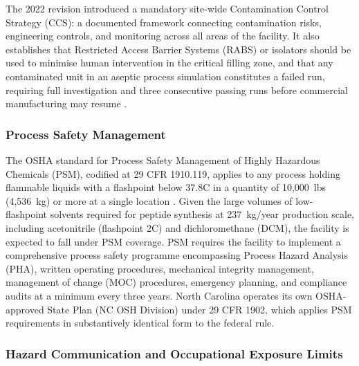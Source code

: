 The 2022 revision introduced a mandatory site-wide Contamination Control Strategy (CCS): a documented framework connecting contamination risks, engineering controls, and monitoring across all areas of the facility. It also establishes that Restricted Access Barrier Systems (RABS) or isolators should be used to minimise human intervention in the critical filling zone, and that any contaminated unit in an aseptic process simulation constitutes a failed run, requiring full investigation and three consecutive passing runs before commercial manufacturing may resume \cite{HoganLovells_Annex1}.

\subsubsection{Process Safety Management}

The OSHA standard for Process Safety Management of Highly Hazardous Chemicals (PSM), codified at 29 CFR 1910.119, applies to any process holding flammable liquids with a flashpoint below 37.8\textdegree{}C in a quantity of 10,000~lbs (4,536~kg) or more at a single location \cite{OSHA_PSM}. Given the large volumes of low-flashpoint solvents required for peptide synthesis at 237~kg/year production scale, including acetonitrile (flashpoint 2\textdegree{}C) and dichloromethane (DCM), the facility is expected to fall under PSM coverage. PSM requires the facility to implement a comprehensive process safety programme encompassing Process Hazard Analysis (PHA), written operating procedures, mechanical integrity management, management of change (MOC) procedures, emergency planning, and compliance audits at a minimum every three years. North Carolina operates its own OSHA-approved State Plan (NC OSH Division) under 29 CFR 1902, which applies PSM requirements in substantively identical form to the federal rule.

\subsubsection{Hazard Communication and Occupational Exposure Limits}

